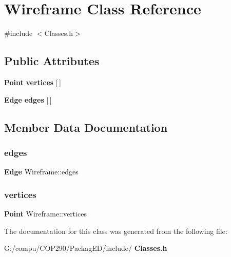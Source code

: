 \section{Wireframe Class Reference}
\label{class_wireframe}


{\ttfamily \#include $<$Classes.\+h$>$}

\subsection*{Public Attributes}
\begin{DoxyCompactItemize}
\item 
\textbf{ Point} \textbf{ vertices} [$\,$]
\item 
\textbf{ Edge} \textbf{ edges} [$\,$]
\end{DoxyCompactItemize}


\subsection{Member Data Documentation}
\mbox{\label{class_wireframe_a9ee60c1a225ed3e092db433aabb8fdc1}} 
\subsubsection{edges}
{\footnotesize\ttfamily \textbf{ Edge} Wireframe\+::edges}

\mbox{\label{class_wireframe_a305eabd539eba9f14de35cdd3e2ecae1}} 
\subsubsection{vertices}
{\footnotesize\ttfamily \textbf{ Point} Wireframe\+::vertices}



The documentation for this class was generated from the following file\+:\begin{DoxyCompactItemize}
\item 
G\+:/compu/\+C\+O\+P290/\+Packag\+E\+D/include/\textbf{ Classes.\+h}\end{DoxyCompactItemize}
